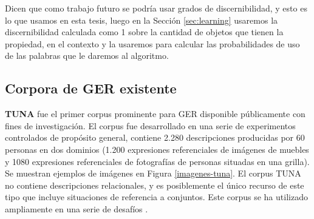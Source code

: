 Dicen que como trabajo futuro se podr\'ia usar grados de discernibilidad, y esto es lo que usamos en esta tesis, luego en la Secci\'on \ref{sec:learning} usaremos la discernibilidad calculada como 1 sobre la cantidad de objetos que tienen la propiedad, en el contexto y la usaremos para calcular las probabilidades de uso de las palabras que le daremos al algoritmo.

%



\subsection{Corpora de GER existente}
\label{sec:corpus2}
\label{sec:corpusTUNA}


{\bf TUNA} \cite{tuna-corpus} fue el primer corpus prominente para GER disponible p\'ublicamente con fines de investigaci\'on. El corpus fue desarrollado en una serie de experimentos controlados de prop\'osito general, contiene 2.280 descripciones producidas por 60 personas en dos dominios (1.200 expresiones referenciales de im\'agenes de muebles y 1080 expresiones referenciales de fotograf\'ias de personas situadas en una grilla). Se muestran ejemplos de im\'agenes en Figura \ref{imagenes-tuna}. El corpus TUNA no contiene descripciones relacionales, y es posiblemente el \'unico recurso de este tipo que incluye situaciones de referencia a conjuntos. Este corpus se ha utilizado ampliamente en una serie de desaf\'ios \cite{reg2009}. \\


